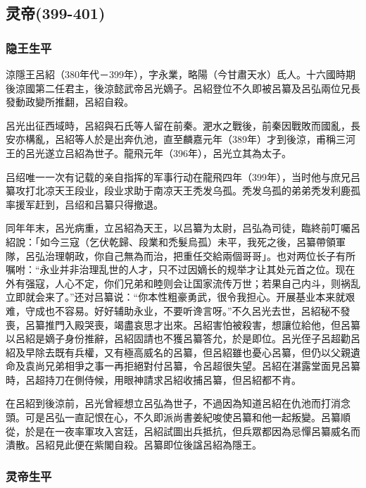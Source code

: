
\subsection{灵帝\tiny(399-401)}

\subsubsection{隐王生平}

涼隱王呂紹（380年代－399年），字永業，略陽（今甘肅天水）氐人。十六國時期後涼國第二任君主，後涼懿武帝呂光嫡子。呂紹登位不久即被呂纂及呂弘兩位兄長發動政變所推翻，呂紹自殺。

呂光出征西域時，呂紹與石氏等人留在前秦。淝水之戰後，前秦因戰敗而國亂，長安亦構亂，呂紹等人於是出奔仇池，直至麟嘉元年（389年）才到後涼，甫稱三河王的呂光遂立吕紹為世子。龍飛元年（396年），呂光立其為太子。

吕绍唯一一次有记载的亲自指挥的军事行动在龍飛四年（399年），当时他与庶兄吕纂攻打北凉天王段业，段业求助于南凉天王秃发乌孤。秃发乌孤的弟弟秃发利鹿孤率援军赶到，吕绍和吕纂只得撤退。

同年年末，呂光病重，立呂紹為天王，以吕纂为太尉，吕弘為司徒，臨終前叮囑呂紹說：「如今三寇（乞伏乾歸、段業和禿髮烏孤）未平，我死之後，呂纂帶領軍隊，呂弘治理朝政，你自己無為而治，把重任交給兩個哥哥」。也对两位长子有所嘱咐：“永业并非治理乱世的人才，只不过因嫡长的规举才让其处元首之位。现在外有强寇，人心不定，你们兄弟和睦则会让国家流传万世；若果自己内斗，则祸乱立即就会来了。”还对吕纂说：“你本性粗豪勇武，很令我担心。开展基业本来就艰难，守成也不容易。好好辅助永业，不要听谗言呀。”不久呂光去世，呂紹秘不發喪，呂纂推門入殿哭喪，竭盡哀思才出來。呂紹害怕被殺害，想讓位給他，但呂纂以呂紹是嫡子身份推辭，呂紹固請也不獲呂纂答允，於是即位。呂光侄子呂超勸呂紹及早除去既有兵權，又有極高威名的呂纂，但呂紹雖也憂心呂纂，但仍以父親遺命及袁尚兄弟相爭之事一再拒絕對付呂纂，令呂超很失望。呂紹在湛露堂面見呂纂時，呂超持刀在側侍候，用眼神請求呂紹收捕呂纂，但呂紹都不肯。

在呂紹到後涼前，呂光曾經想立呂弘為世子，不過因為知道呂紹在仇池而打消念頭。可是呂弘一直記恨在心，不久即派尚書姜紀唆使呂纂和他一起叛變。呂纂順從，於是在一夜率軍攻入宮廷，呂紹試圖出兵抵抗，但兵眾都因為忌憚呂纂威名而潰散。呂紹見此便在紫閣自殺。呂纂即位後諡呂紹為隱王。

\subsubsection{灵帝生平}

